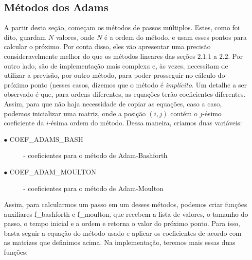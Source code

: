 \documentclass{article}
\begin{document}
\begin{otherlanguage}{brazil}
    \subsection{Métodos dos Adams}
        A partir desta seção, começam os métodos de passos múltiplos. Estes, como foi dito, guardam $N$ valores, onde $N$ é a ordem do método, e usam esses pontos para calcular o próximo. Por conta disso, eles vão apresentar uma precisão consideravelmente melhor do que os métodos lineares das seções $2.1.1$ a $2.2$. Por outro lado, são de implementação mais complexa e, às vezes, necessitam de utilizar a previsão, por outro método, para poder prosseguir no cálculo do próximo ponto (nesses casos, dizemos que o método é \textit{implícito}.\newline
        Um detalhe a ser observado é que, para ordens diferentes, as equações terão coeficientes diferentes. Assim, para que não haja necessidade de copiar as equações, caso a caso, podemos inicializar uma matriz, onde a posição $(i, j)$ contém o $j$-ésimo coeficiente da $i$-ésima ordem do método. Dessa maneira, criamos duas variáveis:
        \begin{description}
          \item[$\bullet$ COEF\_ADAMS\_BASH] - coeficientes para o método de Adam-Bashforth
          \item[$\bullet$ COEF\_ADAM\_MOULTON] - coeficientes para o método de Adam-Moulton
        \end{description}
        Assim, para calcularmos um passo em um desses métodos, podemos criar funções auxiliares f\_bashforth e f\_moulton, que recebem a lista de valores, o tamanho do passo, o tempo inicial e a ordem e retorna o valor do próximo ponto. Para isso, basta seguir a equação do método usado e aplicar os coeficientes de acordo com as matrizes que definimos acima. Na implementação, teremos mais essas duas funções:\newline


\end{otherlanguage}
\end{document}
